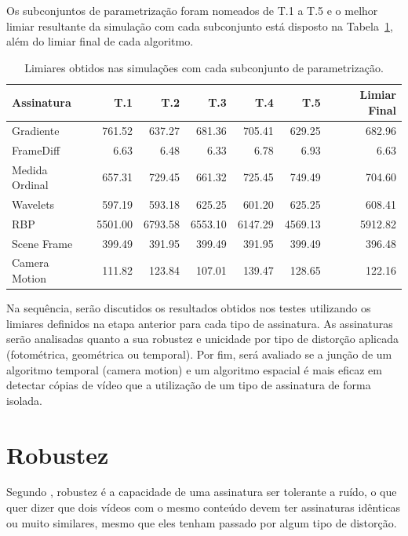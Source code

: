 Os subconjuntos de parametrização foram nomeados de T.1 a T.5 e o melhor limiar resultante da simulação com cada subconjunto está disposto na Tabela~\ref{tab:limiares}, além do limiar final de cada algoritmo.

\begin{table}[h]
	\caption{Limiares obtidos nas simulações com cada subconjunto de parametrização.}
	\label{tab:limiares}
	\begin{tabular}{|l|r|r|r|r|r|r|}
		\hline
		\textbf{Assinatura} & \textbf{T.1} & \textbf{T.2} & \textbf{T.3} & \textbf{T.4} & \textbf{T.5} & \textbf{Limiar Final}\\ \hline
		Gradiente & 761.52 & 637.27 & 681.36 & 705.41 & 629.25 & 682.96\\ \hline
		FrameDiff & 6.63 & 6.48 & 6.33 & 6.78 & 6.93 & 6.63\\ \hline
		Medida Ordinal & 657.31 & 729.45 & 661.32 & 725.45 & 749.49 & 704.60\\ \hline
		Wavelets & 597.19 & 593.18 & 625.25 & 601.20 & 625.25 & 608.41\\ \hline
		RBP & 5501.00 & 6793.58 & 6553.10 & 6147.29 & 4569.13 & 5912.82\\ \hline
		Scene Frame & 399.49 & 391.95 & 399.49 & 391.95 & 399.49 & 396.48\\ \hline
		Camera Motion & 111.82 & 123.84 & 107.01 & 139.47 & 128.65 & 122.16\\ \hline
	\end{tabular}
\end{table}

Na sequência, serão discutidos os resultados obtidos nos testes utilizando os limiares definidos na etapa anterior para cada tipo de assinatura. As assinaturas serão analisadas quanto a sua robustez e unicidade por tipo de distorção aplicada (fotométrica, geométrica ou temporal). Por fim, será avaliado se a junção de um algoritmo temporal (camera motion) e um algoritmo espacial é mais eficaz em detectar cópias de vídeo que a utilização de um tipo de assinatura de forma isolada. 

\section{Robustez}
\label{sec:robustez}

Segundo , robustez é a capacidade de uma assinatura ser tolerante a ruído, o que quer dizer que dois vídeos com o mesmo conteúdo devem ter assinaturas idênticas ou muito similares, mesmo que eles tenham passado por algum tipo de distorção.


